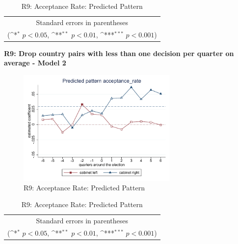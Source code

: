 \documentclass[10pt,a4paper]{scrartcl}
\begin{document}
\begin{table}[!ht]\centering
	\renewcommand{\arraystretch}{1.25}
	\def\sym#1{\ifmmode^{#1}\else\(^{#1}\)\fi}
	\caption{R9: Acceptance Rate: Predicted Pattern}
	\begin{tabular}{l*{2}{c}}
		\hline\hline
		
		\hline\hline
		\multicolumn{3}{c}{\footnotesize Standard errors in parentheses} \\
		\multicolumn{3}{c}{\footnotesize (\sym{*} \(p<0.05\), \sym{**} \(p<0.01\), \sym{***} \(p<0.001\))}\\
	\end{tabular}
\end{table}

\clearpage
\textbf{R9: Drop country pairs with less than one decision per quarter on average - Model 2}
\begin{figure}[!ht]
	\centering
	\includegraphics[width=0.7\textwidth]{figures_edited/acceptance_rate_graph2_R9.pdf}
	\caption{R9: Acceptance Rate: Predicted Pattern}
\end{figure}

\begin{table}[!ht]\centering
	\footnotesize
	\renewcommand{\arraystretch}{1.2}
	\def\sym#1{\ifmmode^{#1}\else\(^{#1}\)\fi}
	\caption{R9: Acceptance Rate: Predicted Pattern}
	\begin{tabular}{l*{2}{c}}
		\hline\hline
		
		\hline\hline
		\multicolumn{3}{c}{\footnotesize Standard errors in parentheses} \\
		\multicolumn{3}{c}{\footnotesize (\sym{*} \(p<0.05\), \sym{**} \(p<0.01\), \sym{***} \(p<0.001\))} \\
	\end{tabular}
\end{table}
\end{document}
